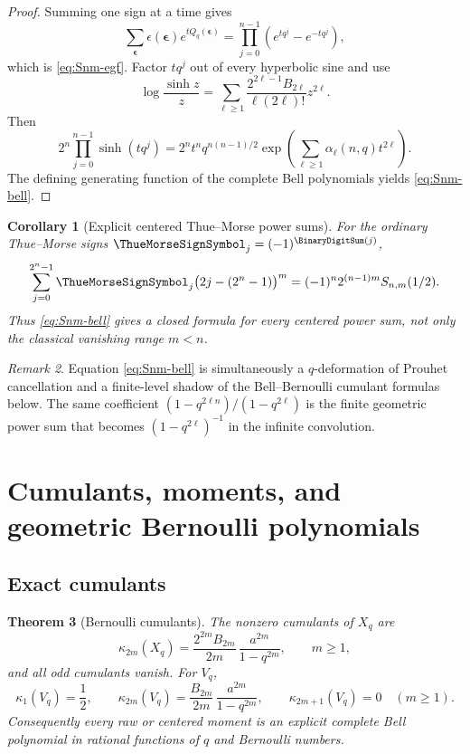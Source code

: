 \documentclass[11pt,oneside]{article}
\newtheorem{theorem}{Theorem}[section]
\newtheorem{corollary}[theorem]{Corollary}
\theoremstyle{definition}
\theoremstyle{remark}
\newtheorem{remark}[theorem]{Remark}
\begin{document}
\begin{proof}
Summing one sign at a time gives
\[
 \sum_{\boldsymbol\epsilon}\epsilon(\boldsymbol\epsilon)
 e^{tQ_q(\boldsymbol\epsilon)}
 =\prod_{j=0}^{n-1}(e^{tq^j}-e^{-tq^j}),
\]
which is \eqref{eq:Snm-egf}.  Factor $tq^j$ out of every hyperbolic sine and use
\begin{equation}
 \log\frac{\sinh z}{z}
 =\sum_{\ell\ge1}
 \frac{2^{2\ell-1}B_{2\ell}}{\ell(2\ell)!}z^{2\ell}.
 \label{eq:logsinh-bernoulli}
\end{equation}
Then
\[
 2^n\prod_{j=0}^{n-1}\sinh(tq^j)
 =2^nt^nq^{n(n-1)/2}
 \exp\!\left(\sum_{\ell\ge1}\alpha_\ell(n,q)t^{2\ell}\right).
\]
The defining generating function of the complete Bell polynomials yields
\eqref{eq:Snm-bell}.
\end{proof}

\begin{corollary}[Explicit centered Thue--Morse power sums]
For the ordinary Thue--Morse signs $\ThueMorseSignSymbol_j=(-1)^{\BinaryDigitSum(j)}$,
\begin{equation}
 \sum_{j=0}^{2^n-1}\ThueMorseSignSymbol_j\bigl(2j-(2^n-1)\bigr)^m
 =(-1)^n2^{(n-1)m}S_{n,m}(1/2).
 \label{eq:centered-TM-sum}
\end{equation}
Thus \eqref{eq:Snm-bell} gives a closed formula for every centered power sum, not only
the classical vanishing range $m<n$.
\end{corollary}

\begin{remark}
Equation \eqref{eq:Snm-bell} is simultaneously a $q$-deformation of Prouhet
cancellation and a finite-level shadow of the Bell--Bernoulli cumulant formulas below.
The same coefficient
$(1-q^{2\ell n})/(1-q^{2\ell})$ is the finite geometric power sum that becomes
$(1-q^{2\ell})^{-1}$ in the infinite convolution.
\end{remark}

\section{Cumulants, moments, and geometric Bernoulli polynomials}
\label{sec:bernoulli}

\subsection{Exact cumulants}

\begin{theorem}[Bernoulli cumulants]
\label{thm:cumulants}
The nonzero cumulants of $X_q$ are
\begin{equation}
 \kappa_{2m}(X_q)=
 \frac{2^{2m}B_{2m}}{2m}\,
 \frac{a^{2m}}{1-q^{2m}},
 \qquad m\ge1,
 \label{eq:X-cumulants}
\end{equation}
and all odd cumulants vanish.  For $V_q$,
\begin{equation}
 \kappa_1(V_q)=\frac12,\qquad
 \kappa_{2m}(V_q)=
 \frac{B_{2m}}{2m}\,
 \frac{a^{2m}}{1-q^{2m}},
 \qquad
 \kappa_{2m+1}(V_q)=0\quad(m\ge1).
 \label{eq:V-cumulants}
\end{equation}
Consequently every raw or centered moment is an explicit complete Bell polynomial in
rational functions of $q$ and Bernoulli numbers.
\end{theorem}
\end{document}

